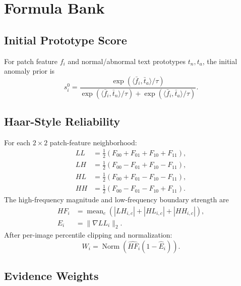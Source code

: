 
\section{Formula Bank}
\label{sec:formula_bank}

\subsection{Initial Prototype Score}

For patch feature $f_i$ and normal/abnormal text prototypes $t_n,t_a$, the
initial anomaly prior is
\begin{equation}
  s_i^0 =
  \frac{\exp(\langle \bar f_i,\bar t_a\rangle/\tau)}
       {\exp(\langle \bar f_i,\bar t_n\rangle/\tau)+
        \exp(\langle \bar f_i,\bar t_a\rangle/\tau)} .
\end{equation}

\subsection{Haar-Style Reliability}

For each $2\times2$ patch-feature neighborhood:
\begin{align}
  LL &= \frac{1}{2}(F_{00}+F_{01}+F_{10}+F_{11}), \\
  LH &= \frac{1}{2}(F_{00}-F_{01}+F_{10}-F_{11}), \\
  HL &= \frac{1}{2}(F_{00}+F_{01}-F_{10}-F_{11}), \\
  HH &= \frac{1}{2}(F_{00}-F_{01}-F_{10}+F_{11}).
\end{align}
The high-frequency magnitude and low-frequency boundary strength are
\begin{align}
  HF_i &= \operatorname{mean}_c(|LH_{i,c}|+|HL_{i,c}|+|HH_{i,c}|),\\
  E_i &= \|\nabla LL_i\|_2 .
\end{align}
After per-image percentile clipping and normalization:
\begin{equation}
  W_i = \operatorname{Norm}\left(\widehat{HF}_i(1-\widehat{E}_i)\right).
\end{equation}

\subsection{Evidence Weights}

